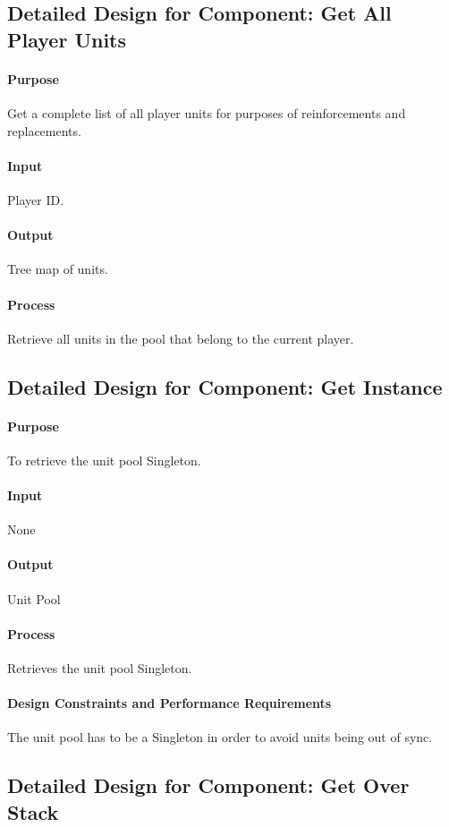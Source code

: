 \documentclass[12pt,a4paper,titlepage]{article}
\begin{document}
\subsection{Detailed Design for Component: Get All Player Units}
\paragraph{Purpose} Get a complete list of all player units for purposes of reinforcements and replacements.
\paragraph{Input} Player ID.
\paragraph{Output} Tree map of units.
\paragraph{Process} Retrieve all units in the pool that belong to the current player.

\subsection{Detailed Design for Component: Get Instance}
\paragraph{Purpose} To retrieve the unit pool Singleton.
\paragraph{Input} None
\paragraph{Output} Unit Pool
\paragraph{Process} Retrieves the unit pool Singleton.
\paragraph{Design Constraints and Performance Requirements} The unit pool has to be a Singleton in order to avoid units being out of sync.

\subsection{Detailed Design for Component: Get Over Stack}
\end{document}
